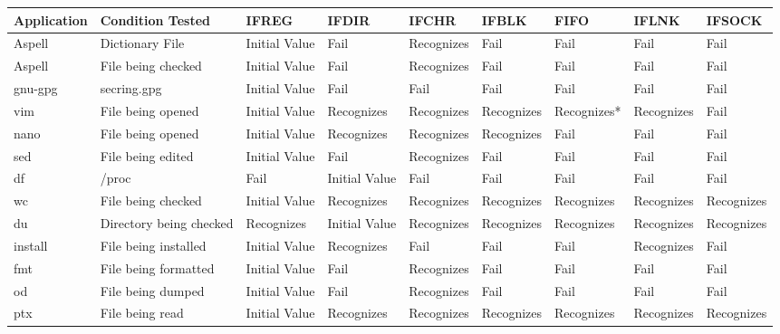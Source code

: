 \begin{table}[t]
    \scriptsize{}
    \begin{tabular}{l  l  |  l  l  l  l  l  l  l}
    \toprule{}
        Application & Condition Tested           & IFREG        & IFDIR        & IFCHR     & IFBLK    & FIFO      & IFLNK    & IFSOCK\\
\hline
        Aspell      & Dictionary File            & Initial Value  & Fail           & Recognizes  & Fail       & Fail        & Fail       & Fail\\
        Aspell      & File being checked         & Initial Value  & Fail           & Recognizes  & Fail       & Fail        & Fail       & Fail\\
        gnu-gpg     & secring.gpg                & Initial Value  & Fail           & Fail        & Fail       & Fail        & Fail       & Fail\\
        vim         & File being opened          & Initial Value  & Recognizes     & Recognizes  & Recognizes & Recognizes* & Recognizes & Fail\\
        nano        & File being opened          & Initial Value  & Recognizes     & Recognizes  & Recognizes & Fail        & Fail       & Fail\\
        sed         & File being edited          & Initial Value  & Fail           & Recognizes  & Fail       & Fail        & Fail       & Fail\\
        df          & /proc                      & Fail           & Initial Value  & Fail        & Fail       & Fail        & Fail       & Fail\\
        wc          & File being checked         & Initial Value  & Recognizes     & Recognizes  & Recognizes & Recognizes  & Recognizes & Recognizes\\
        du          & Directory being checked    & Recognizes     & Initial Value  & Recognizes  & Recognizes & Recognizes  & Recognizes & Recognizes\\
        install     & File being installed       & Initial Value  &
Recognizes     & Fail       & Fail      & Fail       & Recognizes &
Fail\\
        fmt         & File being formatted       & Initial Value  & Fail          & Recognizes  & Fail      & Fail       & Fail      & Fail\\
        od          & File being dumped          & Initial Value  & Fail          & Recognizes  & Fail      & Fail       & Fail      & Fail\\
        ptx         & File being read            & Initial Value  & Recognizes     & Recognizes  & Recognizes & Recognizes  & Recognizes & Recognizes\\

\end{tabular}
\end{table}
